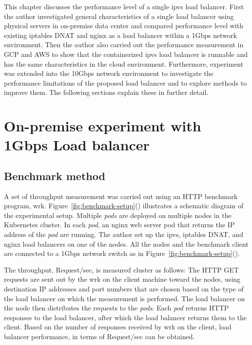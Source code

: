 This chapter discusses the performance level of a single ipvs load balancer.
First the author investigated general characteristics of a single load balancer using physical servers in on-premise data center and compared performance level with existing iptables DNAT and nginx as a load balancer within a 1Gbps network environment.
Then the author also carried out the performance measurement in GCP and AWS to show that the containerized ipvs load balancer is runnable and has the same characteristics in the cloud environment.
Furthermore, experiment was extended into the 10Gbps network environment to investigate the performance limitations of the proposed load balancer and to explore methods to improve them.
The following sections explain these in further detail.

\section{On-premise experiment with 1Gbps Load balancer}
\subsection{Benchmark method}

A set of throughput measurement was carried out using an HTTP benchmark program, wrk\cite{Glozer2016}.
Figure~\ref{fig:benchmark-setup}() illustrates a schematic diagram of the experimental setup.
Multiple {\em pods} are deployed on multiple nodes in the Kubernetes cluster. 
In each {\em pod}, an nginx web server pod that returns the IP address of the {\em pod} are running.
The author set up the ipvs, iptables DNAT, and nginx load balancers on one of the nodes.
All the nodes and the benchmark client are connected to a 1Gbps network switch as in Figure~\ref{fig:benchmark-setup}().

The throughput, Request/sec, is measured cluster as follows:
The HTTP GET requests are sent out by the wrk on the client machine toward the nodes,
using destination IP addresses and port numbers that are chosen based on the type of the load balancer on which the measurement is performed.
The load balancer on the node then distributes the requests to the {\em pods}.
Each {\em pod} returns HTTP responses to the load balancer, after which the load balancer returns them to the client.
Based on the number of responses received by wrk on the client, 
load balancer performance, in terms of Request/sec can be obtained. 

